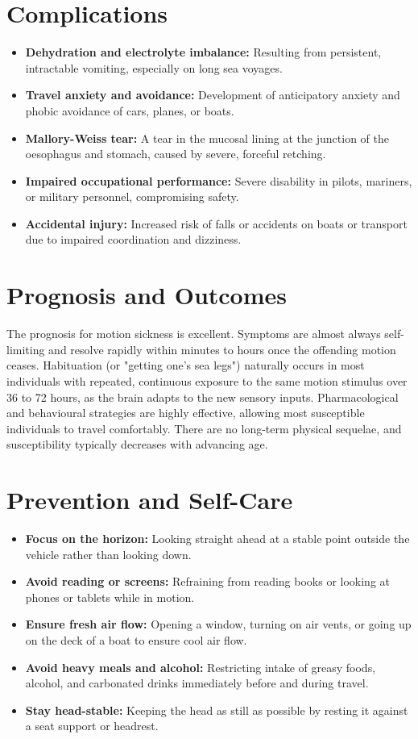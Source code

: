 \section*{Complications}
\begin{itemize}
    \item \textbf{Dehydration and electrolyte imbalance:} Resulting from persistent, intractable vomiting, especially on long sea voyages.
    \item \textbf{Travel anxiety and avoidance:} Development of anticipatory anxiety and phobic avoidance of cars, planes, or boats.
    \item \textbf{Mallory-Weiss tear:} A tear in the mucosal lining at the junction of the oesophagus and stomach, caused by severe, forceful retching.
    \item \textbf{Impaired occupational performance:} Severe disability in pilots, mariners, or military personnel, compromising safety.
    \item \textbf{Accidental injury:} Increased risk of falls or accidents on boats or transport due to impaired coordination and dizziness.
\end{itemize}

\section*{Prognosis and Outcomes}
The prognosis for motion sickness is excellent. Symptoms are almost always self-limiting and resolve rapidly within minutes to hours once the offending motion ceases. Habituation (or "getting one's sea legs") naturally occurs in most individuals with repeated, continuous exposure to the same motion stimulus over 36 to 72 hours, as the brain adapts to the new sensory inputs. Pharmacological and behavioural strategies are highly effective, allowing most susceptible individuals to travel comfortably. There are no long-term physical sequelae, and susceptibility typically decreases with advancing age.

\section*{Prevention and Self-Care}
\begin{itemize}
    \item \textbf{Focus on the horizon:} Looking straight ahead at a stable point outside the vehicle rather than looking down.
    \item \textbf{Avoid reading or screens:} Refraining from reading books or looking at phones or tablets while in motion.
    \item \textbf{Ensure fresh air flow:} Opening a window, turning on air vents, or going up on the deck of a boat to ensure cool air flow.
    \item \textbf{Avoid heavy meals and alcohol:} Restricting intake of greasy foods, alcohol, and carbonated drinks immediately before and during travel.
    \item \textbf{Stay head-stable:} Keeping the head as still as possible by resting it against a seat support or headrest.
\end{itemize}

